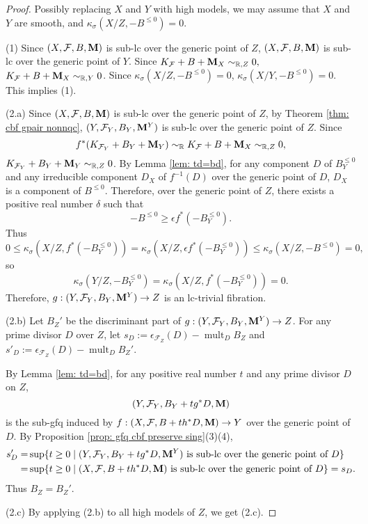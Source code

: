 \documentclass[11pt]{amsart}
\numberwithin{equation}{section}
\newcommand{\Mm}{{\bf{M}}}
\newcommand{\mult}{\operatorname{mult}}
\newcommand{\Ff}{\mathcal{F}}
\theoremstyle{definition}
\theoremstyle{definition}
\theoremstyle{definition}
\begin{document}
\begin{proof}
Possibly replacing $X$ and $Y$ with high models, we may assume that $X$ and $Y$ are smooth, and $\kappa_{\sigma}(X/Z,-B^{\leq 0})=0.$

(1) Since $(X,\Ff,B,\Mm)$ is sub-lc over the generic point of $Z$,  $(X,\Ff,B,\Mm)$ is sub-lc over the generic point of $Y$. Since $K_{\Ff}+B+\Mm_X\sim_{\mathbb R,Z}0,$ $K_{\Ff}+B+\Mm_X\sim_{\mathbb R,Y}0$. Since $\kappa_{\sigma}(X/Z,-B^{\leq 0})=0$, $\kappa_{\sigma}(X/Y,-B^{\leq 0})=0$. This implies (1).

(2.a) Since $(X,\Ff,B,\Mm)$ is sub-lc over the generic point of $Z$, by Theorem \ref{thm: cbf gpair nonnqc}, $(Y,\Ff_Y,B_Y,\Mm^Y)$ is sub-lc over the generic point of $Z$. Since 
$$f^*(K_{\Ff_Y}+B_Y+\Mm_Y)\sim_{\mathbb R}K_{\Ff}+B+\Mm_X\sim_{\mathbb R,Z}0,$$
    $K_{\Ff_Y}+B_Y+\Mm_Y\sim_{\mathbb R,Z}0$. By Lemma \ref{lem: td=bd}, for any component $D$ of $B_Y^{\leq 0}$ and any irreducible component $D_X$ of $f^{-1}(D)$ over the generic point of $D$, $D_X$ is a component of $B^{\leq 0}$. Therefore, over the generic point of $Z$, there exists a positive real number $\delta$ such that
    $$-B^{\leq 0}\geq \epsilon f^*(-B_Y^{\leq 0}).$$
    Thus
    $$0\leq \kappa_{\sigma}(X/Z,f^*(-B_Y^{\leq 0}))=\kappa_{\sigma}(X/Z,\epsilon f^*(-B_Y^{\leq 0}))\leq \kappa_{\sigma}(X/Z,-B^{\leq 0})=0,$$
    so
    $$\kappa_{\sigma}(Y/Z,-B_Y^{\leq 0})=\kappa_{\sigma}(X/Z,f^*(-B_Y^{\leq 0}))=0.$$
    Therefore, $g: (Y,\Ff_Y,B_Y,\Mm^Y)\rightarrow Z$ is an lc-trivial fibration.

(2.b) Let $B_{Z}'$ be the discriminant part of $g: (Y,\Ff_Y,B_Y,\Mm^Y)\rightarrow Z$. For any prime divisor $D$ over $Z$, let $s_D:=\epsilon_{\Ff_Z}(D)-\mult_DB_Z$ and  $s'_D:=\epsilon_{\Ff_Z}(D)-\mult_DB_Z'$. 

By Lemma \ref{lem: td=bd}, for any positive real number $t$ and any prime divisor $D$ on $Z$, 
$$(Y,\Ff_Y,B_Y+tg^*D,\Mm)$$ 
is the sub-gfq induced by $f: (X,\Ff,B+th^*D,\Mm)\rightarrow Y$ over the generic point of $D$. By Proposition \ref{prop: gfq cbf preserve sing}(3)(4),
\begin{align*}
s'_D=&\sup\{t\geq 0\mid (Y,\Ff_Y,B_Y+tg^*D,\Mm^Y)\text{ is sub-lc over the generic point of }D\}\\
=&\sup\{t\geq 0\mid (X,\Ff,B+th^*D,\Mm)\text{ is sub-lc over the generic point of }D\}=s_D.
\end{align*}
Thus $B_Z=B_Z'$. 

(2.c) By applying (2.b) to all high models of $Z$, we get (2.c).
\end{proof}
\end{document}

